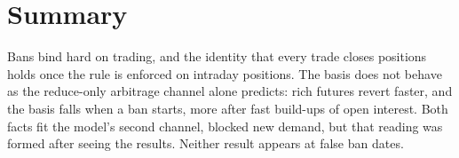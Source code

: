 \section{Summary}
Bans bind hard on trading, and the identity that every trade closes positions holds once the rule is enforced on intraday
positions. The basis does not behave as the reduce-only arbitrage channel alone predicts: rich futures revert faster, and
the basis falls when a ban starts, more after fast build-ups of open interest. Both facts fit the model's second channel,
blocked new demand, but that reading was formed after seeing the results. Neither result appears at false ban dates.
